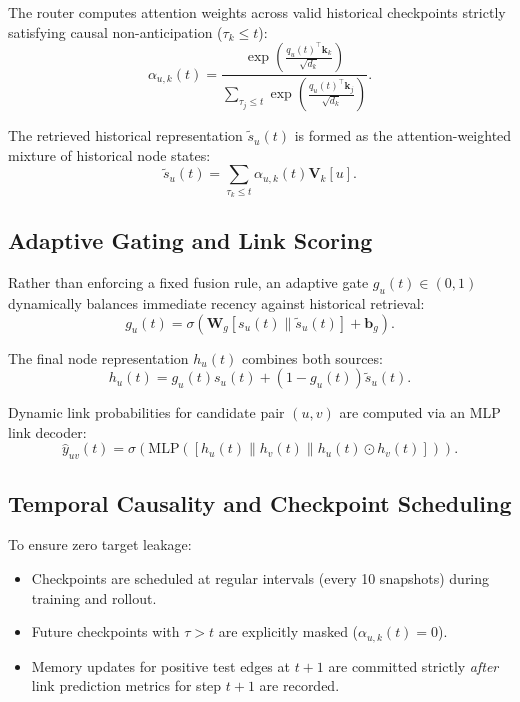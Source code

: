 The router computes attention weights across valid historical checkpoints strictly satisfying causal non-anticipation ($\tau_k \le t$):
\begin{equation}
    \alpha_{u,k}(t) = \frac{\exp\left(\frac{q_u(t)^\top \mathbf{k}_k}{\sqrt{d_k}}\right)}{\sum_{\tau_j \le t} \exp\left(\frac{q_u(t)^\top \mathbf{k}_j}{\sqrt{d_k}}\right)}.
\end{equation}

The retrieved historical representation $\tilde{s}_u(t)$ is formed as the attention-weighted mixture of historical node states:
\begin{equation}
    \tilde{s}_u(t) = \sum_{\tau_k \le t} \alpha_{u,k}(t) \mathbf{V}_k[u].
\end{equation}

\subsection{Adaptive Gating and Link Scoring}
Rather than enforcing a fixed fusion rule, an adaptive gate $g_u(t) \in (0, 1)$ dynamically balances immediate recency against historical retrieval:
\begin{equation}
    g_u(t) = \sigma\left(\mathbf{W}_g [s_u(t) \parallel \tilde{s}_u(t)] + \mathbf{b}_g\right).
\end{equation}

The final node representation $h_u(t)$ combines both sources:
\begin{equation}
    h_u(t) = g_u(t) s_u(t) + (1 - g_u(t)) \tilde{s}_u(t).
\end{equation}

Dynamic link probabilities for candidate pair $(u, v)$ are computed via an MLP link decoder:
\begin{equation}
    \hat{y}_{uv}(t) = \sigma\left(\text{MLP}([h_u(t) \parallel h_v(t) \parallel h_u(t) \odot h_v(t)])\right).
\end{equation}

\subsection{Temporal Causality and Checkpoint Scheduling}
To ensure zero target leakage:
\begin{itemize}
    \item Checkpoints are scheduled at regular intervals (every 10 snapshots) during training and rollout.
    \item Future checkpoints with $\tau > t$ are explicitly masked ($\alpha_{u,k}(t) = 0$).
    \item Memory updates for positive test edges at $t+1$ are committed strictly \textit{after} link prediction metrics for step $t+1$ are recorded.
\end{itemize}
